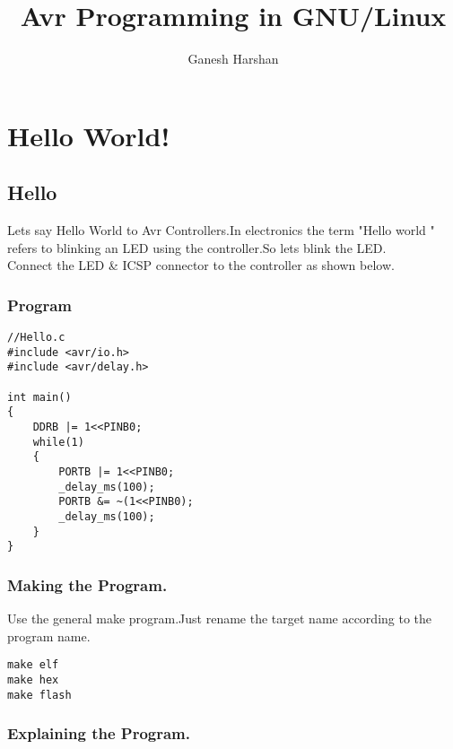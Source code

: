 \documentclass[10pt,a4paper]{report}
\author{Ganesh Harshan}
\title{Avr Programming in GNU/Linux}
\begin{document}
\tableofcontents
\chapter{Hello World!}
\newpage
\begin{flushleft}
\section{Hello}
Lets say Hello World to Avr Controllers.In electronics the term "Hello world " refers to blinking an LED using the controller.So lets blink the LED.\\
Connect the LED \& ICSP connector to the controller as shown below.
\subsection{Program}
\begin{lstlisting}
//Hello.c
#include <avr/io.h>
#include <avr/delay.h>

int main()
{
	DDRB |= 1<<PINB0;
	while(1)
	{
		PORTB |= 1<<PINB0;
		_delay_ms(100);
		PORTB &= ~(1<<PINB0);
		_delay_ms(100);
	}
}
\end{lstlisting}
\subsection{Making the Program.}
Use the general make program.Just rename the target name according to the program name.
\begin{lstlisting}
make elf
make hex
make flash
\end{lstlisting}
\subsection{Explaining the Program.}
\end{flushleft}
\end{document}
